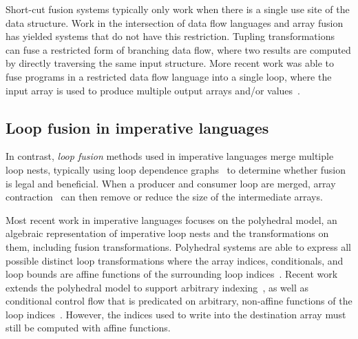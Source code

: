 Short-cut fusion systems typically only work when there is a single use site of
the data structure. Work in the intersection of data flow languages and array
fusion has yielded systems that do not have this restriction. Tupling
transformations~\cite{Hu:1997tk,Grelck:2006ci} can fuse a restricted form of
branching data flow, where two results are computed by directly traversing the
same input structure. More recent work was able to fuse programs in a restricted
data flow language into a single loop, where the input array is used to produce
multiple output arrays and/or values~\cite{Lippmeier:2013vz}.



\subsection{Loop fusion in imperative languages}

In contrast, \emph{loop fusion} methods used in imperative languages merge
multiple loop nests, typically using loop dependence graphs~\cite{Warren:1984ka}
to determine whether fusion is legal and beneficial. When a producer and
consumer loop are merged, array contraction~\cite{Sarkar:1991ff} can then remove
or reduce the size of the intermediate arrays.

Most recent work in imperative languages focuses on the polyhedral model, an
algebraic representation of imperative loop nests and the transformations on
them, including fusion transformations. Polyhedral systems are able to express
all possible distinct loop transformations where the array indices,
conditionals, and loop bounds are affine functions of the surrounding loop
indices~\cite{Pouchet:2011ig,Mehta:2014ir}. Recent work extends the polyhedral
model to support arbitrary indexing~\cite{Venkat:2014cg}, as well as conditional
control flow that is predicated on arbitrary, non-affine functions of the loop
indices~\cite{Benabderrahmane:2010vc}. However, the indices used to write into
the destination array must still be computed with affine functions.


